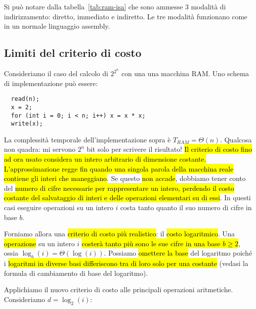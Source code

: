 \documentclass[a4paper,11pt,oneside]{article}
\theoremstyle{plain}
\theoremstyle{definition}
\theoremstyle{remark}
\begin{document}
Si può notare dalla tabella~\ref{tab:ram-isa} che sono ammesse 3 modalità di
indirizzamento: diretto, immediato e indiretto. Le tre modalità funzionano come
in un normale linguaggio assembly.

\subsection{Limiti del criterio di costo}\label{sec:log-costo}

Consideriamo il caso del calcolo di $2^{2^n}$ con una una macchina RAM\@. Uno
schema di implementazione può essere:

\begin{lstlisting}
  read(n);
  x = 2;
  for (int i = 0; i < n; i++) x = x * x;
  write(x);
\end{lstlisting}

La complessità temporale dell'implementazione sopra è $T_{RAM} = \Theta(n)$.
Qualcosa non quadra: mi servono $2^n$ bit solo per scrivere il risultato! \hl{Il
criterio di costo fino ad ora usato considera un intero arbitrario di dimensione
costante. L'approssimazione regge fin quando una singola parola della macchina
reale contiene gli interi che maneggiano}. Se questo \hl{non accade}, dobbiamo
tener conto del \hl{numero di cifre necessarie per rappresentare un intero,
perdendo il costo costante del salvataggio di interi e delle operazioni
elementari su di essi}. In questi casi eseguire operazioni su un intero $i$
costa tanto quanto il suo numero di cifre in base $b$.

Forniamo allora una \hl{criterio di costo più realistico}: il \hl{costo
logaritmico}. Una \hl{operazione} su un intero $i$ \hl{costerà tanto più sono le
sue cifre in una base $b \geq 2$}, ossia $\log_b(i) = \Theta(\log(i))$. Possiamo
\hl{omettere la base} del logaritmo poiché i \hl{logaritmi in diverse basi
differiscono tra di loro solo per una costante} (vedasi la formula di
cambiamento di base del logaritmo).

Applichiamo il nuovo criterio di costo alle principali operazioni aritmetiche.
Consideriamo $d = \log_2(i)$:
\end{document}
